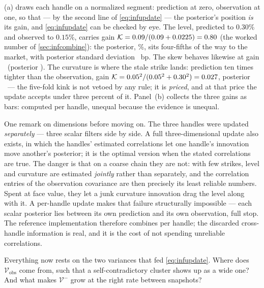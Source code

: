 (a) draws each handle on a normalized segment:
prediction at zero, observation at one, so that --- by the second
line of \cref{eq:infupdate} --- the posterior's position \emph{is}
its gain, and \cref{eq:infupdate} can be checked by eye.  The level,
predicted to $0.30\%$ and observed to $0.15\%$, carries gain
$\mathcal{K}=0.09/(0.09+0.0225)=0.80$ (the worked
number of \cref{sec:infcombine}): the posterior,
\MacFiltCasePostLevelPct\%, sits four-fifths of the way to the
market, with posterior standard deviation
\MacFiltCasePostSdLevelBp\ bp.  The skew behaves likewise at gain
\MacFiltCaseGainSkew\ (posterior \MacFiltCasePostSkew).  The
curvature is where the stale strike lands: prediction ten times tighter than the
observation, gain
$\mathcal{K}=0.05^2/(0.05^2+0.30^2)=0.027$, posterior
\MacFiltCasePostCurv\ --- the five-fold kink is not vetoed by any
rule; it is \emph{priced}, and at that price the update accepts
under three percent of it.  Panel~(b) collects the three gains as
bars: computed per handle, unequal because the evidence is
unequal.

One remark on dimensions before moving on.  The three handles were
updated \emph{separately} --- three scalar filters side by side.  A
full three-dimensional update also exists, in which the handles'
estimated correlations let one handle's innovation move another's
posterior; it is the optimal version when the stated correlations
are true.  The danger is that on a coarse chain they are not:
with few strikes, level and curvature are estimated \emph{jointly}
rather than separately, and the correlation entries of the
observation covariance are then precisely its least reliable
numbers.  Spent at face value, they let a junk curvature innovation
drag the level along with it.  A per-handle update makes that
failure structurally impossible --- each scalar posterior lies
between its own prediction and its own observation, full stop.  The
reference implementation therefore combines per handle; the
discarded cross-handle information is real, and it is the cost of
not spending unreliable correlations.

Everything now rests on the two variances that fed
\cref{eq:infupdate}.  Where does
$\mathcal{V}_{\mathrm{obs}}$ come from, such that a
self-contradictory cluster shows up as a wide one?  And what makes
$\mathcal{V}^{-}$ grow at the right rate between snapshots?
